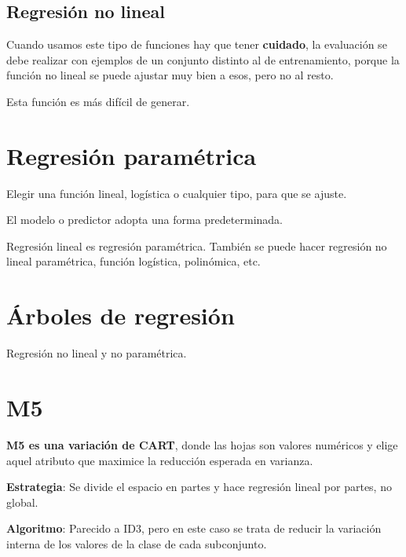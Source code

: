 \documentclass[12pt, twoside, openright]{report} %
\begin{document}
\subsection{Regresión no lineal}

Cuando usamos este tipo de funciones hay que tener \textbf{cuidado}, la evaluación se debe realizar con ejemplos de un conjunto distinto al de entrenamiento, porque la función no lineal se puede ajustar muy bien a esos, pero no al resto.

Esta función es más difícil de generar.

\section{Regresión paramétrica}

Elegir una función lineal, logística o cualquier tipo, para que se ajuste.

El modelo o predictor adopta una forma predeterminada.

Regresión lineal es regresión paramétrica. También se puede hacer regresión no lineal paramétrica, función logística, polinómica, etc.

\section{Árboles de regresión}

Regresión no lineal y no paramétrica.

\section{M5}

\textbf{M5 es una variación de CART}, donde las hojas son valores numéricos y elige aquel atributo que maximice la reducción esperada en varianza.

\textbf{Estrategia}: Se divide el espacio en partes y hace regresión lineal por partes, no global.

\textbf{Algoritmo}: Parecido a ID3, pero en este caso se trata de reducir la variación interna de los valores de la clase de cada subconjunto.
\end{document}
